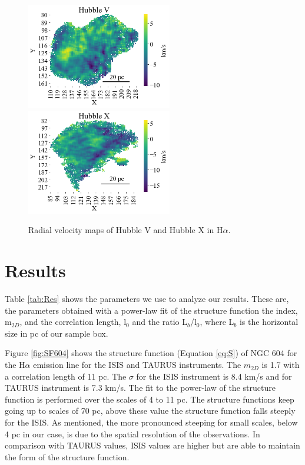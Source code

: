 \documentclass[fleqn,usenatbib]{mnras}
\begin{document}
\begin{figure}
\centering 
\includegraphics[width=2.5in]{Figures/MV.png}
\includegraphics[width=2.5in]{Figures/MX.png}
\caption{Radial velocity maps of Hubble V and Hubble X in H$\alpha$.}
\label{fig:MHub}
\end{figure}



\section{Results}\label{sec:res}

Table \ref{tab:Res} shows the parameters we use to analyze our results. These are, the parameters obtained with a power-law fit of the structure function the index, m$_{2D}$, and the correlation length, l$_{0}$ and the ratio L$_{b}$/l$_{0}$, where L$_{b}$ is the horizontal size in pc of our sample box.  

Figure \ref{fig:SF604} shows the structure function (Equation \ref{eq:S}) of NGC 604 for the H$\alpha$ emission line for the ISIS and TAURUS instruments. The $m_{2D}$ is 1.7 with a correlation length of 11 pc. The $\sigma$ for the ISIS instrument is 8.4 km/s and for TAURUS instrument is 7.3 km/s. The fit to the power-law of the structure function is performed over the scales of 4 to 11 pc. The structure functions keep going up to scales of 70 pc, above these value the structure function falls steeply for the ISIS. As \cite{arthur2016turbulence} mentioned, the more pronounced steeping for small scales, below 4 pc in our case, is due to the spatial resolution of the observations. In comparison with TAURUS values, ISIS values are higher but are able to maintain the form of the structure function. 
\end{document}
